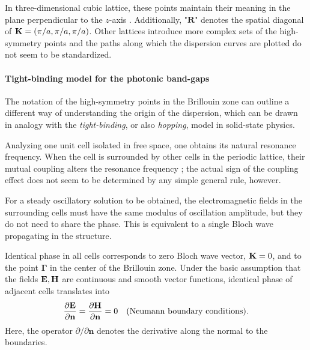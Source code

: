 In three-dimensional cubic lattice, these points maintain their meaning in the plane perpendicular to the $z$-axis \cite[p. 99]{klingshirn2007semiconductor}. Additionally, "$\mathbf{R}$" denotes the spatial diagonal of ${\mathbf{K}} = (\pi/a, \pi/a, \pi/a)$. Other lattices introduce more complex sets of the high-symmetry points and the paths along which the dispersion curves are plotted do not seem to be standardized.



\paragraph{Tight-binding model for the photonic band-gaps} %
The notation of the high-symmetry points in the Brillouin zone can outline a different way of understanding the origin of the dispersion, which can be drawn in analogy with the \textit{tight-binding},   %
or also \textit{hopping},  %
model in solid-state physics. 

\label{tight-binding}
Analyzing one unit cell isolated in free space, one obtains its natural resonance frequency.  When the cell is surrounded by other cells in the periodic lattice, their mutual coupling alters the resonance frequency \cite[p. 75]{klingshirn2007semiconductor}; the actual sign of the coupling effect does not seem to be determined by any simple general rule, however.	

For a steady oscillatory solution to be obtained, the electromagnetic fields in the surrounding cells must have the same modulus of oscillation amplitude, but they do not need to share the phase. This is equivalent to a single Bloch wave propagating in the structure. 

Identical phase in all cells corresponds to zero Bloch wave vector, ${\mathbf{K}} = 0$, and to the point $\mathbf{\Gamma}$ in the center of the Brillouin zone. Under the basic assumption that the fields $\mathbf{E}, \mathbf{H}$ are continuous and smooth vector functions, identical phase of adjacent cells translates into
\begin{equation} \frac{\partial \mathbf{E}}{\partial\mathbf{n}} = \frac{\partial \mathbf{H}}{\partial\mathbf{n}} = 0 \quad\text{(Neumann boundary conditions).} \label{eq_bcond_neumann}\end{equation} 
Here, the operator $\partial/\partial \mathbf{n}$ denotes the derivative along the normal to the boundaries.

